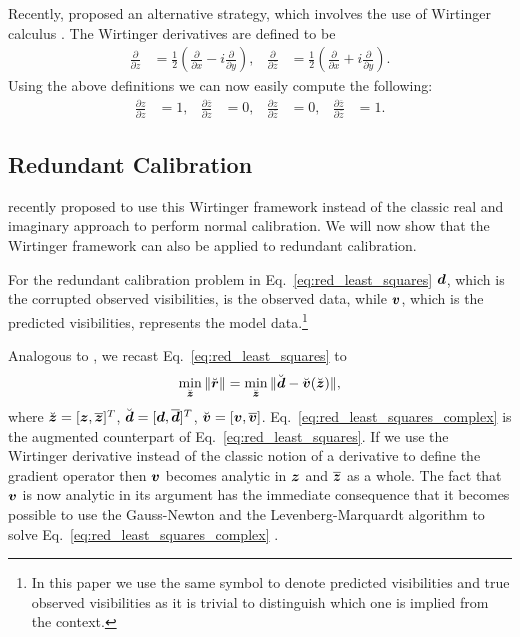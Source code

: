 \documentclass[useAMS,usenatbib]{mn2e}
\newcommand{\bz}{\bmath{z}}
\newcommand{\br}{\bmath{r}}
\newcommand{\bd}{\bmath{d}}
\newcommand{\bv}{\bmath{v}}
\newcommand{\conj}[1]{\overline{#1}}
\begin{document}
Recently, \citet{Sorber2012} proposed an alternative strategy, which involves the use of Wirtinger calculus \citep{Wirtinger1927}. The Wirtinger derivatives 
are defined to be 
\begin{align}
\frac{\partial}{\partial z} &= \frac{1}{2}\left ( \frac{\partial}{\partial x} -  i \frac{\partial}{\partial y} \right ),&\frac{\partial}{\partial \conj{z}} &= \frac{1}{2}\left ( \frac{\partial}{\partial x} +  i \frac{\partial}{\partial y} \right ). 
\end{align}
Using the above definitions we can now easily compute the following:
\begin{align}
\frac{\partial z}{\partial z} & = 1, & \frac{\partial \conj{z}}{\partial z}&=0, & \frac{\partial z}{\partial \conj{z}} & = 0, & \frac{\partial \conj{z}}{\partial \conj{z}}&=1.
\end{align}

\subsection{Redundant Calibration}
\citet{Smirnov2015} recently proposed to use this Wirtinger framework instead of the classic real and imaginary approach to perform normal calibration. We will now show
that the Wirtinger framework can also be applied to redundant calibration.

For the redundant calibration problem in Eq.~\eqref{eq:red_least_squares} $\bd$, which is the corrupted observed visibilities, is the observed data,
while $\bv$, which is the predicted visibilities, represents the model data.\footnote{In this paper we use the same symbol to denote predicted visibilities and true observed visibilities as it
is trivial to distinguish which one is implied from the context.}   

 Analogous to \cite{Smirnov2015}, we recast Eq.~\eqref{eq:red_least_squares} to 
\begin{equation}
\label{eq:red_least_squares_complex}
\min_{\breve{\bz}} \|\breve{\br}\| = \min_{\breve{\bz}} \|\breve{\bd} - \breve{\bv}(\breve{\bz})\|, 
\end{equation}
where $\breve{\bz} = [\bz,\conj{\bz}]^T$, $\breve{\bd} = [\bd,\conj{\bd}]^T$, $\breve{\bv} = [\bv,\conj{\bv}]$. Eq.~\eqref{eq:red_least_squares_complex} is the augmented counterpart of Eq.~\eqref{eq:red_least_squares}.
If we use the Wirtinger derivative instead of the classic notion of a derivative to define the gradient operator then 
$\bv$ becomes analytic in $\bz$ and $\conj{\bz}$ as a whole. The fact that $\bv$ is now analytic in its argument has the immediate consequence that it becomes possible to use the Gauss-Newton
and the Levenberg-Marquardt algorithm to solve Eq.~\eqref{eq:red_least_squares_complex} \citep{Smirnov2015}.
\end{document}
